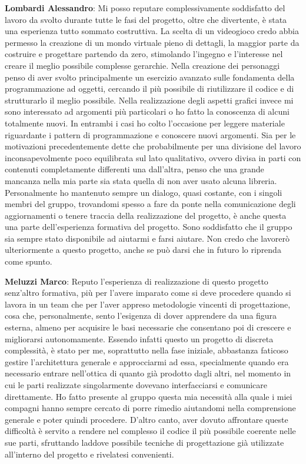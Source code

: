 \documentclass[a4paper,12pt, hidelinks]{report}
\begin{document}
	\item \textbf{Lombardi Alessandro}: Mi posso reputare complessivamente soddisfatto del lavoro da svolto durante tutte le fasi del progetto, oltre che divertente, è stata una esperienza tutto sommato costruttiva. La scelta di un videogioco credo abbia permesso la creazione di un mondo virtuale pieno di dettagli, la maggior parte da costruire e progettare partendo da zero, stimolando l'ingegno e l'interesse nel creare il meglio possibile complesse gerarchie. Nella creazione dei personaggi penso di aver svolto principalmente un esercizio avanzato sulle fondamenta della programmazione ad oggetti, cercando il più possibile di riutilizzare il codice e di strutturarlo il meglio possibile. Nella realizzazione degli aspetti grafici invece mi sono interessato ad argomenti più particolari o ho fatto la conoscenza di alcuni totalmente nuovi. In entrambi i casi ho colto l'occasione per leggere materiale riguardante i pattern di programmazione e conoscere nuovi argomenti. Sia per le motivazioni precedentemente dette che probabilmente per una divisione del lavoro inconsapevolmente poco equilibrata sul lato qualitativo, ovvero divisa in parti con contenuti completamente differenti una dall'altra, penso che una grande mancanza nella mia parte sia stata quella di non aver usato alcuna libreria. Personalmente ho mantenuto sempre un dialogo, quasi costante, con i singoli membri del gruppo, trovandomi spesso a fare da ponte nella comunicazione degli aggiornamenti o tenere traccia della realizzazione del progetto, è anche questa una parte dell'esperienza formativa del progetto. Sono soddisfatto che il gruppo sia sempre stato disponibile ad aiutarmi e farsi aiutare. Non credo che lavorerò ulteriormente a questo progetto, anche se può darsi che in futuro lo riprenda come spunto.

	\item \textbf{Meluzzi Marco}: Reputo l'esperienza di realizzazione di questo progetto senz'altro formativa, più per l'avere imparato come si deve procedere quando si lavora in un team che per l'aver appreso metodologie vincenti di progettazione, cosa che, personalmente, sento l'esigenza di dover apprendere da una figura esterna, almeno per acquisire le basi necessarie che consentano poi di crescere e migliorarsi autonomamente. Essendo infatti questo un progetto di discreta complessità, è stato per me, soprattutto nella fase iniziale, abbastanza faticoso gestire l'architettura generale e approcciarmi ad essa, specialmente quando era necessario entrare nell'ottica di quanto già prodotto dagli altri, nel momento in cui le parti realizzate singolarmente dovevano interfacciarsi e comunicare direttamente. Ho fatto presente al gruppo questa mia necessità alla quale i miei compagni hanno sempre cercato di porre rimedio aiutandomi nella comprensione generale e poter quindi procedere. D'altro canto, aver dovuto affrontare queste difficoltà è servito a rendere nel complesso il codice il più possibile coerente nelle sue parti, sfruttando laddove possibile tecniche di progettazione già utilizzate all'interno del progetto e rivelatesi convenienti.
	
\end{document}
